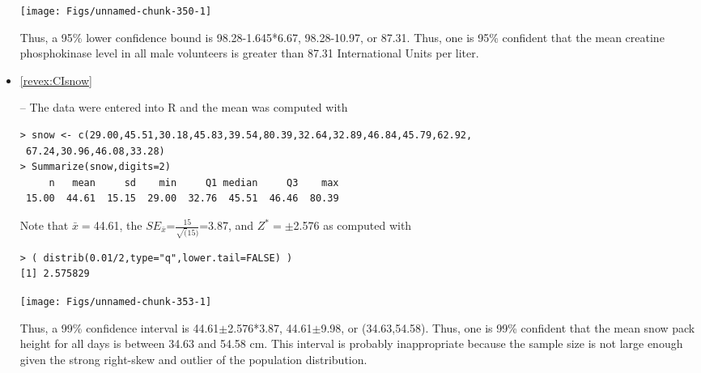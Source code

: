 \documentclass[10pt,openany]{book}\usepackage[]{graphicx}\usepackage[]{color}
\makeatletter
\newenvironment{kframe}{%
 \def\at@end@of@kframe{}%
 \ifinner\ifhmode%
  \def\at@end@of@kframe{\end{minipage}}%
  \begin{minipage}{\columnwidth}%
 \fi\fi%
 \def\FrameCommand##1{\hskip\@totalleftmargin \hskip-\fboxsep
 \colorbox{shadecolor}{##1}\hskip-\fboxsep
     \hskip-\linewidth \hskip-\@totalleftmargin \hskip\columnwidth}%
 \MakeFramed {\advance\hsize-\width
   \@totalleftmargin\z@ \linewidth\hsize
   \@setminipage}}%
 {\par\unskip\endMakeFramed%
 \at@end@of@kframe}
\newenvironment{knitrout}{}{} %
\makeatother
\begin{document}
\begin{itemize}
\begin{knitrout}
{\centering \texttt{[image: Figs/unnamed-chunk-350-1]} 

}



\end{knitrout}
Thus, a 95\% lower confidence bound is 98.28-1.645*6.67, 98.28-10.97, or 87.31.  Thus, one is 95\% confident that the mean creatine phosphokinase level in all male volunteers is greater than 87.31 International Units per liter.
  \item \hypertarget{ans:CIsnow}{\ref{revex:CIsnow}} -- The data were entered into R and the mean was computed with
\begin{knitrout}
\color{fgcolor}\begin{kframe}
\begin{verbatim}
> snow <- c(29.00,45.51,30.18,45.83,39.54,80.39,32.64,32.89,46.84,45.79,62.92,
 67.24,30.96,46.08,33.28)
> Summarize(snow,digits=2)
     n   mean     sd    min     Q1 median     Q3    max 
 15.00  44.61  15.15  29.00  32.76  45.51  46.46  80.39 
\end{verbatim}
\end{kframe}
\end{knitrout}

Note that $\bar{x}=$44.61, the $SE_{\bar{x}}$=$\frac{15}{\sqrt(15)}$=3.87, and $Z^{*}=\pm$2.576 as computed with
\begin{knitrout}
\color{fgcolor}\begin{kframe}
\begin{verbatim}
> ( distrib(0.01/2,type="q",lower.tail=FALSE) )
[1] 2.575829
\end{verbatim}
\end{kframe}

{\centering \texttt{[image: Figs/unnamed-chunk-353-1]} 

}



\end{knitrout}
Thus, a 99\% confidence interval is 44.61$\pm$2.576*3.87, 44.61$\pm$9.98, or (34.63,54.58).  Thus, one is 99\% confident that the mean snow pack height for all days is between 34.63 and 54.58 cm.  This interval is probably inappropriate because the sample size is not large enough given the strong right-skew and outlier of the population distribution.


\end{itemize}
\end{document}
